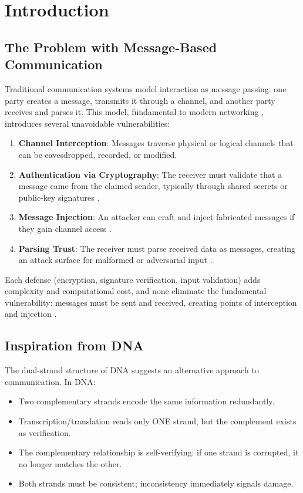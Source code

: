 \documentclass[twocolumn,10pt,a4paper]{article}
\theoremstyle{plain}
\theoremstyle{definition}
\begin{document}
\section{Introduction}

\subsection{The Problem with Message-Based Communication}

Traditional communication systems model interaction as message passing: one party creates a message, transmits it through a channel, and another party receives and parses it. This model, fundamental to modern networking \cite{saltzer1975protection}, introduces several unavoidable vulnerabilities:

\begin{enumerate}
\item \textbf{Channel Interception}: Messages traverse physical or logical channels that can be eavesdropped, recorded, or modified.
\item \textbf{Authentication via Cryptography}: The receiver must validate that a message came from the claimed sender, typically through shared secrets or public-key signatures \cite{diffie1976new,rsa1978method}.
\item \textbf{Message Injection}: An attacker can craft and inject fabricated messages if they gain channel access \cite{goldwasser1984probabilistic}.
\item \textbf{Parsing Trust}: The receiver must parse received data as messages, creating an attack surface for malformed or adversarial input \cite{schneier1996applied}.
\end{enumerate}

Each defense (encryption, signature verification, input validation) \cite{goldreich2001foundations,katz2014introduction} adds complexity and computational cost, and none eliminate the fundamental vulnerability: messages must be sent and received, creating points of interception and injection \cite{dolev1983security}.

\subsection{Inspiration from DNA}

The dual-strand structure of DNA suggests an alternative approach to communication. In DNA:
\begin{itemize}
\item Two complementary strands encode the same information redundantly.
\item Transcription/translation reads only ONE strand, but the complement exists as verification.
\item The complementary relationship is self-verifying: if one strand is corrupted, it no longer matches the other.
\item Both strands must be consistent; inconsistency immediately signals damage.
\end{itemize}
\end{document}
